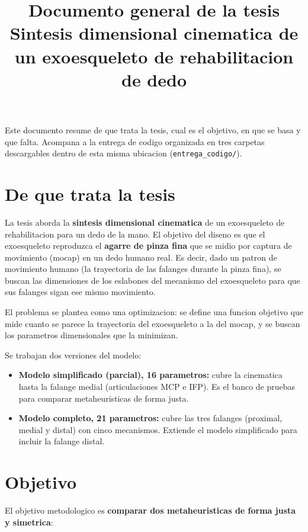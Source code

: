 \documentclass[11pt,a4paper]{article}
\title{Documento general de la tesis\\[2pt]
\large Sintesis dimensional cinematica de un exoesqueleto de rehabilitacion de dedo}
\author{}
\date{}
\begin{document}
\maketitle

Este documento resume de que trata la tesis, cual es el objetivo, en que se basa
y que falta. Acompana a la entrega de codigo organizada en tres carpetas
descargables dentro de esta misma ubicacion (\texttt{entrega\_codigo/}).

\section{De que trata la tesis}

La tesis aborda la \textbf{sintesis dimensional cinematica} de un exoesqueleto de
rehabilitacion para un dedo de la mano. El objetivo del diseno es que el
exoesqueleto reproduzca el \textbf{agarre de pinza fina} que se midio por captura
de movimiento (mocap) en un dedo humano real. Es decir, dado un patron de
movimiento humano (la trayectoria de las falanges durante la pinza fina), se
buscan las dimensiones de los eslabones del mecanismo del exoesqueleto para que
sus falanges sigan ese mismo movimiento.

El problema se plantea como una optimizacion: se define una funcion objetivo que
mide cuanto se parece la trayectoria del exoesqueleto a la del mocap, y se buscan
los parametros dimensionales que la minimizan.

Se trabajan dos versiones del modelo:

\begin{itemize}[leftmargin=1.4em]
  \item \textbf{Modelo simplificado (parcial), 16 parametros:} cubre la
        cinematica hasta la falange medial (articulaciones MCP e IFP). Es el
        banco de pruebas para comparar metaheuristicas de forma justa.
  \item \textbf{Modelo completo, 21 parametros:} cubre las tres falanges
        (proximal, medial y distal) con cinco mecanismos. Extiende el modelo
        simplificado para incluir la falange distal.
\end{itemize}

\section{Objetivo}

El objetivo metodologico es \textbf{comparar dos metaheuristicas de forma justa y
simetrica}:
\end{document}
